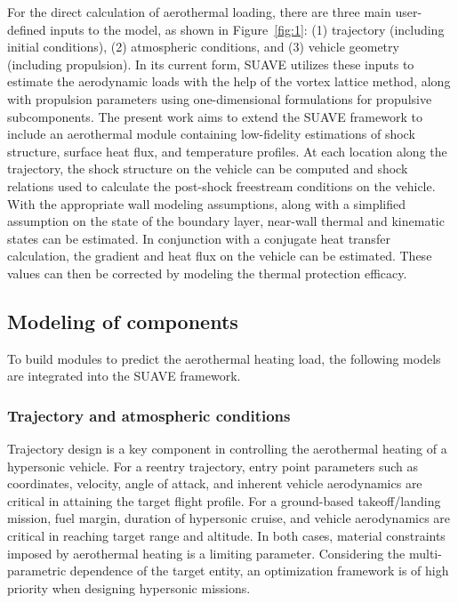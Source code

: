 \documentclass[%
 aip,
 amsmath,amssymb,
preprint,%
]{revtex4-1}
\begin{document}
For the direct calculation of aerothermal loading, there are three main user-defined inputs to the model, as shown in Figure~\ref{fig:1}: (1) trajectory (including initial conditions), (2) atmospheric conditions, and (3) vehicle geometry (including propulsion). In its current form, SUAVE utilizes these inputs to estimate the aerodynamic loads with the help of the vortex lattice method, along with propulsion parameters using one-dimensional formulations for propulsive subcomponents. The present work aims to extend the SUAVE framework to include an aerothermal module containing low-fidelity estimations of shock structure, surface heat flux, and temperature profiles. 
At each location along the trajectory, the shock structure on the vehicle can be computed and shock relations used to calculate the post-shock freestream conditions on the vehicle. With the appropriate wall modeling assumptions, along with a simplified assumption on the state of the boundary layer, near-wall thermal and kinematic states can be estimated. In conjunction with a conjugate heat transfer calculation, the gradient and heat flux on the vehicle can be estimated. These values can then be corrected by modeling the thermal protection efficacy. %


\subsection{Modeling of components}
To build modules to predict the aerothermal heating load, the following models are integrated into the SUAVE framework.

\subsubsection{Trajectory and atmospheric conditions}

Trajectory design is a key component in controlling the aerothermal heating of a hypersonic vehicle. For a reentry trajectory, entry point parameters such as coordinates, velocity, angle of attack, and inherent vehicle aerodynamics are critical in attaining the target flight profile. For a ground-based takeoff/landing mission, fuel margin, duration of hypersonic cruise, and vehicle aerodynamics are critical in reaching target range and altitude. In both cases, material constraints imposed by aerothermal heating is a limiting parameter. Considering the multi-parametric dependence of the target entity, an optimization framework is of high priority when designing hypersonic missions. %
\end{document}
